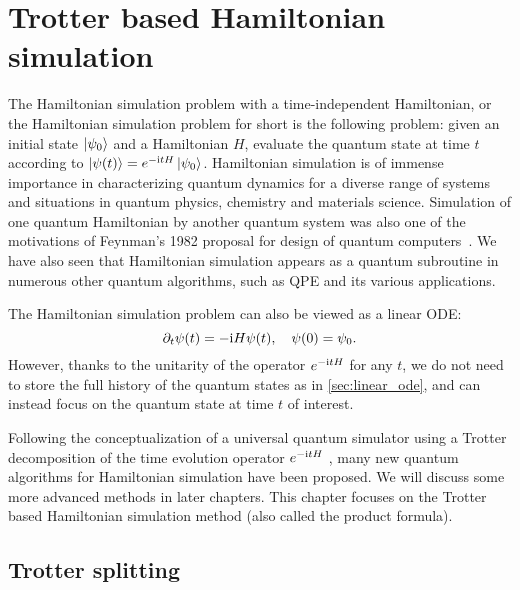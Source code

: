 \chapter{Trotter based Hamiltonian simulation}

The Hamiltonian simulation problem with a time-independent Hamiltonian, or the Hamiltonian simulation problem for short is the following problem: given an initial state $\ket{\psi_0}$ and a Hamiltonian $H$, evaluate the quantum state at time $t$ according to $\ket{\psi(t)}=e^{-\mathrm{i} t H}\ket{\psi_0}$. Hamiltonian simulation is of immense importance in characterizing quantum dynamics for a diverse range of systems and situations in quantum physics, chemistry and materials science. Simulation of one quantum Hamiltonian by another quantum system was also one of the motivations of Feynman's 1982 proposal for design of quantum computers~\cite{Feynman1982}. We have also seen that Hamiltonian simulation appears as a quantum subroutine in numerous other quantum algorithms, such as QPE and its various applications. 

The Hamiltonian simulation problem can also be viewed as a linear ODE:
\begin{equation}
\partial_t \psi(t)=-\mathrm{i} H\psi(t), \quad \psi(0)=\psi_0.
\end{equation}
However, thanks to the unitarity of the operator $e^{-\mathrm{i} t H}$ for any $t$, we do not need to store the full history of the quantum states as in \cref{sec:linear_ode}, and can instead focus on the quantum state at time $t$ of interest.

Following the conceptualization of a universal quantum simulator using a Trotter decomposition of the time evolution operator $e^{-\mathrm{i} tH}$ \cite{Lloyd1996},
many new quantum algorithms for Hamiltonian simulation have been proposed.
We will discuss some more advanced methods in later chapters.
This chapter focuses on the Trotter based Hamiltonian simulation method (also called the product formula).


\section{Trotter splitting}

